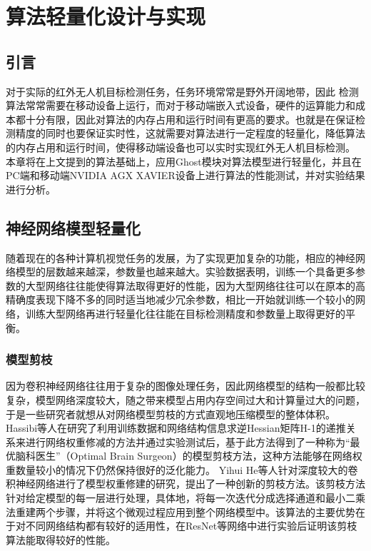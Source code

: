 
\chapter{算法轻量化设计与实现}

\section{引言}
对于实际的红外无人机目标检测任务，任务环境常常是野外开阔地带，因此
检测算法常常需要在移动设备上运行，而对于移动端嵌入式设备，硬件的运算能力和成本都十分有限，因此对算法的内存占用和运行时间有更高的要求。也就是在保证检测精度的同时也要保证实时性，这就需要对算法进行一定程度的轻量化，降低算法的内存占用和运行时间，使得移动端设备也可以实时实现红外无人机目标检测。
本章将在上文提到的算法基础上，应用Ghost模块对算法模型进行轻量化，并且在PC端和移动端NVIDIA AGX XAVIER设备上进行算法的性能测试，并对实验结果进行分析。

\section{神经网络模型轻量化}
随着现在的各种计算机视觉任务的发展，为了实现更加复杂的功能，相应的神经网络模型的层数越来越深，参数量也越来越大。实验数据表明，训练一个具备更多参数的大型网络往往能使得算法取得更好的性能，因为大型网络往往可以在原本的高精确度表现下降不多的同时适当地减少冗余参数，相比一开始就训练一个较小的网络，训练大型网络再进行轻量化往往能在目标检测精度和参数量上取得更好的平衡。

\subsection{模型剪枝}
因为卷积神经网络往往用于复杂的图像处理任务，因此网络模型的结构一般都比较复杂，模型网络深度较大，随之带来模型占用内存空间过大和计算量过大的问题，于是一些研究者就想从对网络模型剪枝的方式直观地压缩模型的整体体积。
Hassibi等人\cite{hassibi1992second}在研究了利用训练数据和网络结构信息求逆Hessian矩阵H-1的递推关系来进行网络权重修减的方法并通过实验测试后，基于此方法得到了一种称为“最优脑科医生”（Optimal Brain Surgeon）的模型剪枝方法，这种方法能够在网络权重数量较小的情况下仍然保持很好的泛化能力。
Yihui He等人\cite{he2017channel}针对深度较大的卷积神经网络进行了模型权重修建的研究，提出了一种创新的剪枝方法。该剪枝方法针对给定模型的每一层进行处理，具体地，将每一次迭代分成选择通道和最小二乘法重建两个步骤，并将这个微观过程应用到整个网络模型中。该算法的主要优势在于对不同网络结构都有较好的适用性，在ResNet等网络中进行实验后证明该剪枝算法能取得较好的性能。

